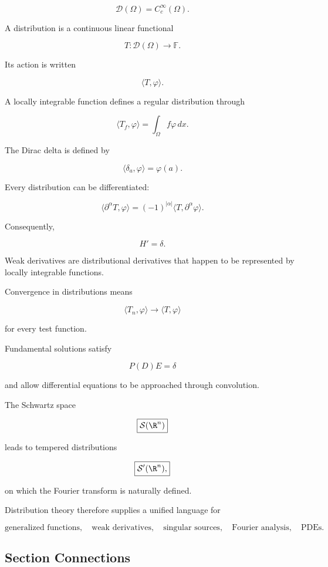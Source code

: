 \[
\boxed{
\mathcal{D}(\Omega)
=
C_c^\infty(\Omega).
}
\]

A distribution is a continuous linear functional

\[
\boxed{
T:\mathcal{D}(\Omega)\to\mathbb{F}.
}
\]

Its action is written

\[
\boxed{
\langle T,\varphi\rangle.
}
\]

A locally integrable function defines a regular distribution through

\[
\boxed{
\langle T_f,\varphi\rangle
=
\int_\Omega f\varphi\,dx.
}
\]

The Dirac delta is defined by

\[
\boxed{
\langle\delta_a,\varphi\rangle
=
\varphi(a).
}
\]

Every distribution can be differentiated:

\[
\boxed{
\langle
\partial^\alpha T,\varphi
\rangle
=
(-1)^{|\alpha|}
\langle
T,\partial^\alpha\varphi
\rangle.
}
\]

Consequently,

\[
\boxed{
H'=\delta.
}
\]

Weak derivatives are distributional derivatives that happen to be
represented by locally integrable functions.

Convergence in distributions means

\[
\boxed{
\langle T_n,\varphi\rangle
\to
\langle T,\varphi\rangle
}
\]

for every test function.

Fundamental solutions satisfy

\[
\boxed{
P(D)E=\delta
}
\]

and allow differential equations to be approached through convolution.

The Schwartz space

\[
\boxed{
\mathcal{S}(\R^n)
}
\]

leads to tempered distributions

\[
\boxed{
\mathcal{S}'(\R^n),
}
\]

on which the Fourier transform is naturally defined.

Distribution theory therefore supplies a unified language for

\[
\boxed{
\text{generalized functions},
\quad
\text{weak derivatives},
\quad
\text{singular sources},
\quad
\text{Fourier analysis},
\quad
\text{PDEs}.
}
\]

\subsection{Section Connections}
\label{subsec:distribution-theory-connections}

